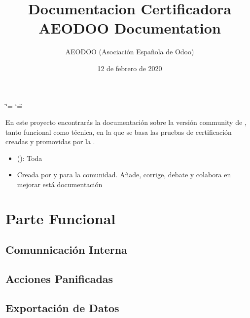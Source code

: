 \documentclass[letterpaper,10pt,spanish]{sphinxmanual}
\title{Documentacion Certificadora AEODOO Documentation}
\date{12 de febrero de 2020}
\author{AEODOO (Asociación Española de Odoo)}
\begin{document}
\ifdefined\shorthandoff
  \ifnum\catcode`\=\string=\active\shorthandoff{=}\fi
  \ifnum\catcode`\"=\active{}\fi
\fi

\pagestyle{empty}
\sphinxmaketitle
\pagestyle{plain}
\sphinxtableofcontents
\pagestyle{normal}
\label{\detokenize{index::doc}}


En este proyecto encontrarás la documentación sobre la versión community de ,
tanto funcional como técnica, en la que se basa las pruebas de certificación
creadas y promovidas por la .
\begin{itemize}
\item {} 
 (): Toda 

\item {} 
Creada por y para la comunidad. Añade, corrige, debate y colabora en mejorar está documentación

\end{itemize}


\chapter{Parte Funcional}
\label{\detokenize{index:parte-funcional}}


\section{Comunnicación Interna}
\label{\detokenize{funcional/basico/comunicacion-interna:comunnicacion-interna}}\label{\detokenize{funcional/basico/comunicacion-interna:comunicacion-interna}}\label{\detokenize{funcional/basico/comunicacion-interna::doc}}

\section{Acciones Panificadas}
\label{\detokenize{funcional/basico/acciones-planificadas:acciones-panificadas}}\label{\detokenize{funcional/basico/acciones-planificadas:acciones-planificadas}}\label{\detokenize{funcional/basico/acciones-planificadas::doc}}

\section{Exportación de Datos}
\label{\detokenize{funcional/basico/exportar-datos-csv-y-excel:exportacion-de-datos}}\label{\detokenize{funcional/basico/exportar-datos-csv-y-excel:exportar-datos-csv-y-excel}}\label{\detokenize{funcional/basico/exportar-datos-csv-y-excel::doc}}
\end{document}

